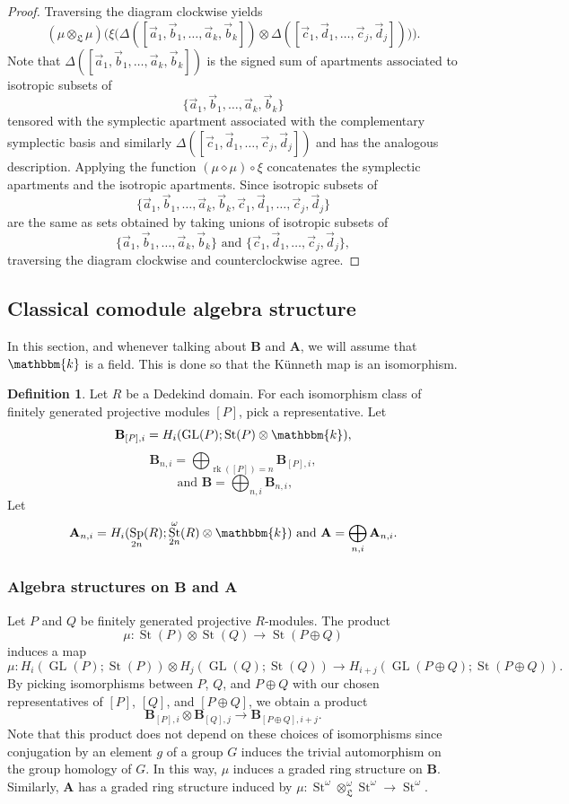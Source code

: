 \documentclass[11pt,letterpaper]{amsart}
\newcommand{\bk}{\mathbbm{k}}
\DeclareMathOperator{\Sp}{Sp}
\newcommand{\HH}{\mathbf{B}}
\newcommand{\HA}{\mathbf{A}}
\newcommand{\LL}{\mathfrak{L}}
\numberwithin{theoremcounter}{section}
\theoremstyle{definition}
\newtheorem{definition}[Defauto]{Definition}
\theoremstyle{remark}
\DeclareMathOperator{\rk}{rk}
\DeclareMathOperator{\GL}{GL}
\DeclareMathOperator{\St}{St}
\begin{document}
\begin{proof}
Traversing the diagram clockwise yields $$(\mu \otimes_\LL \mu) \big( \xi \big( \Delta([\vec a_1,\vec b_1,\ldots,\vec a_k,\vec b_k]) \otimes\Delta( [\vec c_1,\vec d_1,\ldots,\vec c_j,\vec d_j]) \big) \big). $$ Note that $\Delta([\vec a_1,\vec b_1,\ldots,\vec a_k,\vec b_k])$ is the signed sum of apartments associated to isotropic subsets of $$\{\vec a_1,\vec b_1,\ldots,\vec a_k,\vec b_k\}$$ tensored with the symplectic apartment associated with the complementary symplectic basis and similarly $\Delta( [\vec c_1,\vec d_1,\ldots,\vec c_j,\vec d_j])$ and has the analogous description. Applying the function $(\mu \diamond \mu) \circ \xi$ concatenates the symplectic apartments and the isotropic apartments. Since isotropic subsets of $$\{\vec a_1,\vec b_1,\ldots,\vec a_k,\vec b_k,\vec c_1,\vec d_1,\ldots,\vec c_j,\vec d_j\}$$ are the same as sets obtained by taking unions of isotropic subsets of $$\{\vec a_1,\vec b_1,\ldots,\vec a_k,\vec b_k \} \text{ and }\{\vec c_1,\vec d_1,\ldots,\vec c_j,\vec d_j\},$$ traversing the diagram clockwise and counterclockwise agree. 
\end{proof}




\subsection{Classical comodule algebra structure}

In this section, and whenever talking about $\HH$ and $\HA$, we will assume that $\bk$ is a field. This is done so that the K\"unneth map is an isomorphism.

\begin{definition}
    Let $R$ be a Dedekind domain. For each isomorphism class of finitely generated projective modules $[P]$, pick a representative. Let
    $$\HH_{[P],i}= H_i(\GL(P);\St(P) \otimes \bk),$$ 
    $$\HH_{n,i}= \bigoplus_{\rk([P])=n} \HH_{[P],i},$$ 
    $$\text{ and }\HH= \bigoplus_{n,i} \HH_{n,i},$$
   Let $$\HA_{n,i}=H_i(\Sp_{2n}(R);\St_{2n}^\omega(R) \otimes \bk) \text{ and }\HA=\bigoplus_{n,i} \HA_{n,i}.$$ 
\end{definition}

\subsubsection{Algebra structures on $\HH$ and $\HA$}

Let $P$ and $Q$ be finitely generated projective $R$-modules. The product $$\mu\colon  \St(P) \otimes \St(Q) \to \St(P \oplus Q)$$ induces a map $$\mu\colon  H_i(\GL(P);\St(P)) \otimes H_j(\GL(Q); \St(Q)) \to H_{i+j}(\GL(P \oplus Q); \St(P \oplus Q)).$$
By picking isomorphisms between $P$, $Q$, and $P \oplus Q$ with our chosen representatives of $[P]$, $[Q]$, and $[P \oplus Q]$, we obtain a product $$ \HH_{[P],i} \otimes \HH_{[Q],j} \to \HH_{[P \oplus Q],i+j}.$$ Note that this product does not depend on these choices of isomorphisms since conjugation by an element $g$ of a group $G$ induces the trivial automorphism on the group homology of $G$. In this way, $\mu$ induces a graded ring structure on $\HH$. Similarly, $\HA$ has a graded ring structure induced by $\mu\colon \St^\omega \otimes_\LL^\omega \St^\omega \to \St^\omega$. 
\end{document}
